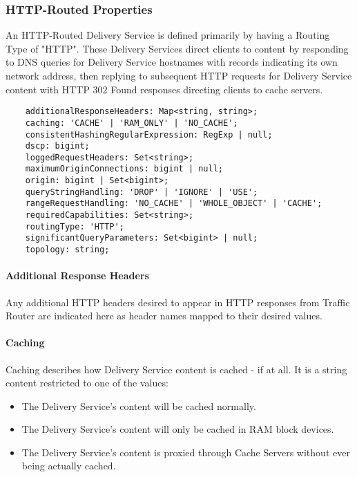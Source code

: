 \subsubsection{HTTP-Routed Properties}
An HTTP-Routed Delivery Service is defined primarily by having a Routing Type of
"HTTP". These Delivery Services direct clients to content by responding to DNS
queries for Delivery Service hostnames with records indicating its own network
address, then replying to subsequent HTTP requests for Delivery Service content
with HTTP 302 Found responses directing clients to cache servers.

\begin{codelisting}
\begin{verbatim}
	additionalResponseHeaders: Map<string, string>;
	caching: 'CACHE' | 'RAM_ONLY' | 'NO_CACHE';
	consistentHashingRegularExpression: RegExp | null;
	dscp: bigint;
	loggedRequestHeaders: Set<string>;
	maximumOriginConnections: bigint | null;
	origin: bigint | Set<bigint>;
	queryStringHandling: 'DROP' | 'IGNORE' | 'USE';
	rangeRequestHandling: 'NO_CACHE' | 'WHOLE_OBJECT' | 'CACHE';
	requiredCapabilities: Set<string>;
	routingType: 'HTTP';
	significantQueryParameters: Set<bigint> | null;
	topology: string;
\end{verbatim}
\end{codelisting}

\paragraph{Additional Response Headers}
Any additional HTTP headers desired to appear in HTTP responses from Traffic
Router are indicated here as header names mapped to their desired values.

\paragraph{Caching}
Caching describes how Delivery Service content is cached - if at all. It is a
string content restricted to one of the values:

\begin{itemize}
	\item {} The Delivery Service's content will be cached normally.
	\item {} The Delivery Service's content will only be cached
	in RAM block devices.
	\item {} The Delivery Service's content is proxied through
	Cache Servers without ever being actually cached.
\end{itemize}

